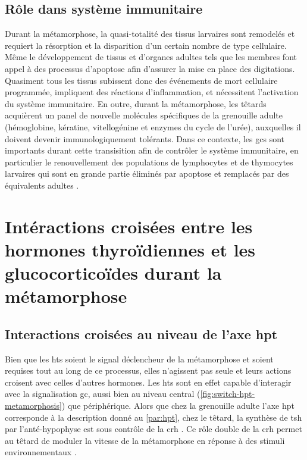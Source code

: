 \documentclass[../main.tex]{subfiles}
\begin{document}
\subsection{Rôle dans système immunitaire}
Durant la métamorphose, la quasi-totalité des tissus larvaires sont remodelés et requiert la résorption et la disparition d'un certain nombre de type cellulaire.
Même le développement de tissus et d'organes adultes tels que les membres font appel à des processus d'apoptose afin d'assurer la mise en place des digitations.
Quasiment tous les tissus subissent donc des événements de mort cellulaire programmée, impliquent des réactions d'inflammation, et nécessitent l'activation du système immunitaire.
En outre, durant la métamorphose, les têtards acquièrent un panel de nouvelle molécules spécifiques de la grenouille adulte (hémoglobine, kératine, vitellogénine et enzymes du cycle de l'urée), auxquelles il doivent devenir immunologiquement tolérants.
Dans ce contexte, les \glspl{gc} sont importants durant cette transisition afin de contrôler le système immunitaire, en particulier le renouvellement des populations de lymphocytes et de thymocytes larvaires qui sont en grande partie éliminés par apoptose et remplacés par des équivalents adultes \citep{Rollins-Smith1997,Schreiber2011}.




\section{Intéractions croisées entre les hormones thyroïdiennes et les glucocorticoïdes durant la métamorphose}

\subsection{Interactions croisées au niveau de l'axe \gls{hpt}}
Bien que les \glspl{ht} soient le signal déclencheur de la métamorphose et soient requises tout au long de ce processus, elles n'agissent pas seule et leurs actions croisent avec celles d'autres hormones.
Les \glspl{ht} sont en effet capable d'interagir avec la signalisation \gls{gc}, aussi bien au niveau central (\autoref{fig:switch-hpt-metamorphosis}) que périphérique.
Alors que chez la grenouille adulte l'axe \gls{hpt} corresponde à la description donné au \autoref{par:hpt}, chez le têtard, la synthèse de \gls{tsh} par l'anté-hypophyse est sous contrôle de la \gls{crh} \citep{Denver1993}.
Ce rôle double de la \gls{crh} permet au têtard de moduler la vitesse de la métamorphose en réponse à des stimuli environnementaux \citep{Denver1997a,Denver2009}.
\end{document}
